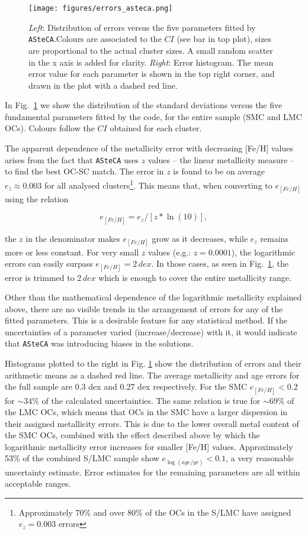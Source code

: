 \documentclass[a4paper,fleqn,usenatbib]{mnras}
\begin{document}
\begin{figure}
\texttt{[image: figures/errors\_asteca.png]}
\caption{\emph{Left}: Distribution of errors versus the five parameters fitted
by \texttt{ASteCA}.\@ Colours are associated to the $CI$ (see bar in top plot),
sizes are proportional to the actual cluster sizes. A small random scatter in
the x axis is added for clarity.
\emph{Right}: Error histogram. The mean error value for each parameter is shown
in the top right corner, and drawn in the plot with a dashed red line.}
\label{fig:errors}
\end{figure}

In Fig.~\ref{fig:errors} we show the distribution of the standard deviations
versus the five fundamental parameters fitted by the code, for the entire sample
(SMC and LMC OCs). Colours follow the $CI$ obtained for each cluster.

The apparent dependence of the metallicity error with decreasing [Fe/H] values
arises from the fact that \texttt{ASteCA} uses $z$ values -- the linear metallicity
measure -- to find the best OC-SC match. The error in $z$ is found to be on
average $e_z{\approx}0.003$ for all analysed clusters\footnote{Approximately
70\% and over 80\% of the OCs in the S/LMC have assigned $e_z{=}0.003$ errors}.
This means that, when converting to $e_{[Fe/H]}$ using the relation

\begin{equation}
e_{[Fe/H]} = e_z/[z*\ln(10)],
\end{equation}

\noindent the $z$ in the denominator makes $e_{[Fe/H]}$ grow as it decreases,
while $e_z$ remains more or less constant.
For very small $z$ values (e.g.: $z=0.0001$), the
logarithmic errors can easily surpass $e_{[Fe/H]}=2\,dex$. In those cases, as
seen in Fig.~\ref{fig:errors}, the error is trimmed to $2\,dex$ which is enough
to cover the entire metallicity range.

Other than the mathematical dependence of the logarithmic metallicity explained
above, there are no visible trends in the arrangement of errors for any of the
fitted parameters. This is a desirable feature for any statistical method.
If the uncertainties of a parameter varied (increase/decrease) with it, it would
indicate that \texttt{ASteCA} was introducing biases in the solutions.

Histograms plotted to the right in Fig. \ref{fig:errors} show the distribution
of errors and their arithmetic means as a dashed red line.
The average metallicity and age errors for the full sample are 0.3 dex and 0.27
dex respectively. For the SMC $e_{[Fe/H]}<0.2$ for $\sim$34\% of the calculated
uncertainties. The same relation is true for $\sim$69\% of the LMC OCs, which
means that OCs in the SMC have a larger dispersion in their assigned
metallicity errors. This is due to the lower overall metal content of the SMC
OCs, combined with the effect described above by which the logarithmic
metallicity error increases for smaller [Fe/H] values.
Approximately 53\% of the combined S/LMC sample show $e_{\log(age/yr)}{<}0.1$, a
very reasonable uncertainty estimate.
Error estimates for the remaining parameters are all within acceptable ranges.\\
\end{document}
